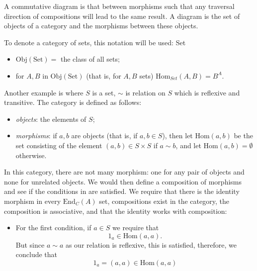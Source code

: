 \documentclass{report}
\begin{document}
A commutative diagram is that between morphisms such that any traversal direction of compositions will lead to the same result. A diagram is the set of objects of a category and the morphisms between these objects.

\begin{examples}
    \begin{example}[\label{exm:1.3.2}]
        To denote a category of sets, this notation will be used: Set
            \begin{itemize}
                \item $\text{Obj}(\text{Set})= $ the class of all sets;

                \item for $A, B$ in $\text{Obj}(\text{Set})$ (that is, for $A, B$ sets) $\text{Hom}_{Set}(A, B) = B^{A}$.
            \end{itemize}
    \end{example}

    \begin{example}[\label{exm:1.3.3}]
        Another example is where $S$ is a set, $\sim $ is relation on $S$ which is reflexive and transitive. The category is defined as follows:
            \begin{itemize}
                \item \textit{objects}: the elements of $S$;

                \item \textit{morphisms}: if $a, b$ are objects (that is, if $a, b \in S$), then let $\text{Hom}(a, b)$ be the set consisting of the element $(a, b) \in S \times S$ if $a \sim b$, and let $\text{Hom}(a, b) = \emptyset$ otherwise. 
            \end{itemize}
        In this category, there are not many morphism: one for any pair of objects and none for unrelated objects. We would then define a composition of morphisms and see if the conditions in  are satisfied. We require that there is the identity morphism in every $\text{End}_{C}(A)$ set, compositions exist in the category, the composition is associative, and that the identity works with composition:
        \begin{itemize}
            \item For the first condition, if $a \in S$ we require that
                \begin{equation*}
                    1_{a} \in \text{Hom}(a, a).
                \end{equation*}
                But since $a \sim a$ as our relation is reflexive, this is satisfied, therefore, we conclude that
                \begin{equation*}
                    1_{a} = (a, a) \in \text{Hom}(a, a)
                \end{equation*}


\end{itemize}
\end{example}
\end{examples}
\end{document}
